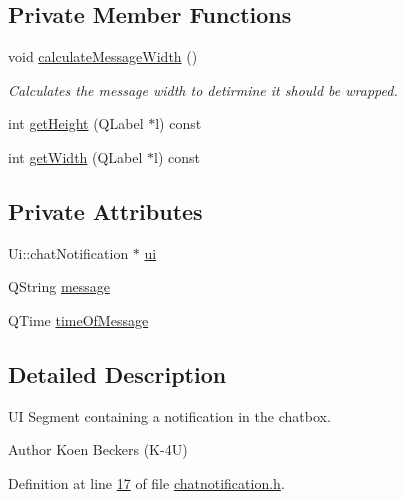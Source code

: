 \subsection*{Private Member Functions}
\begin{DoxyCompactItemize}
\item 
void \hyperlink{classclient_1_1chat_notification_a88bb5e2ae6d834567b46f1f0ea846e06}{calculate\-Message\-Width} ()
\begin{DoxyCompactList}\small\item\em Calculates the message width to detirmine it should be wrapped. \end{DoxyCompactList}\item 
int \hyperlink{classclient_1_1chat_notification_ac3e7bb4220cd0accabf071539af0c19b}{get\-Height} (Q\-Label $\ast$l) const 
\item 
int \hyperlink{classclient_1_1chat_notification_a4629f1c83084f928a5efced7a79a1655}{get\-Width} (Q\-Label $\ast$l) const 
\end{DoxyCompactItemize}
\subsection*{Private Attributes}
\begin{DoxyCompactItemize}
\item 
Ui\-::chat\-Notification $\ast$ \hyperlink{classclient_1_1chat_notification_af80ab0e57d9b0a0bb79abf5a991fdfab}{ui}
\item 
Q\-String \hyperlink{classclient_1_1chat_notification_a0052e2119fe7620b3dc955ba6135c915}{message}
\item 
Q\-Time \hyperlink{classclient_1_1chat_notification_ac2cf7f6030625593ba26f5f62ebd3482}{time\-Of\-Message}
\end{DoxyCompactItemize}


\subsection{Detailed Description}
U\-I Segment containing a notification in the chatbox. 

\begin{DoxyAuthor}{Author}
Koen Beckers (K-\/4\-U) 
\end{DoxyAuthor}


Definition at line \hyperlink{chatnotification_8h_source_l00017}{17} of file \hyperlink{chatnotification_8h_source}{chatnotification.\-h}.



